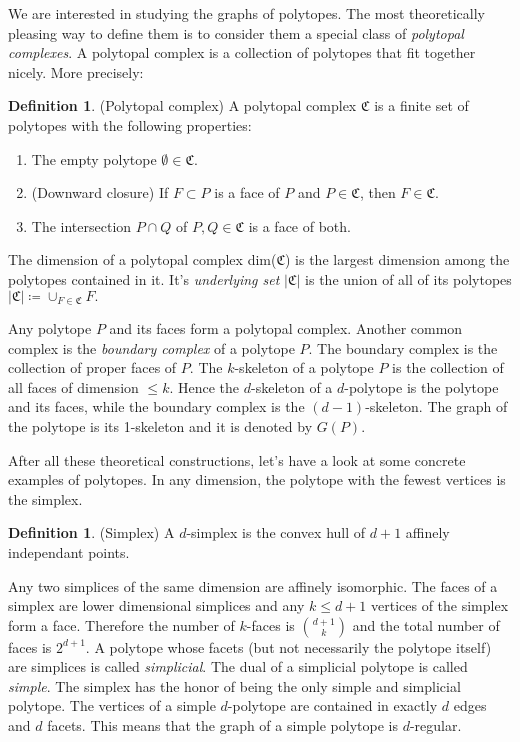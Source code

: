 \documentclass[a4paper,12pt]{book}
\theoremstyle{plain}
\theoremstyle{definition}
\newtheorem{definition}[theorem]{Definition}
\begin{document}
We are interested in studying the graphs of polytopes. The most theoretically 
pleasing way to define them is to consider them a special class of 
\textit{polytopal complexes}.
A polytopal complex is a collection of polytopes that fit together nicely.
More precisely:
\begin{definition}
 (Polytopal complex) A polytopal complex $\mathfrak{C}$ is a finite set of 
polytopes with the following properties:
\begin{enumerate}
 \item The empty polytope $\emptyset \in \mathfrak{C}$.
  \item (Downward closure) If $F \subset P$ is a face of $P$ and $P \in 
\mathfrak{C}$, then 
$F \in \mathfrak{C}$.
\item The intersection $P\cap Q$ of $P,Q \in \mathfrak{C}$ is a face of both.

\end{enumerate}

\end{definition}

The dimension of a polytopal complex dim($\mathfrak{C}$) is the largest dimension
among the polytopes contained in it. It's \textit{underlying set} $|\mathfrak{C}|$ is the union of all of 
its polytopes $  |\mathfrak{C}| \coloneqq \cup_{F\in \mathfrak{C}} F.$

Any polytope $P$ and its faces form a polytopal complex. Another common complex is the 
\textit{boundary complex} of a polytope
$P$. The boundary complex is the collection of proper faces of $P$.
The $k$-skeleton of a polytope $P$ is the collection of all faces of dimension $\leq 
k$. Hence the $d$-skeleton of a $d$-polytope is the polytope and its faces, while the 
boundary complex is the $(d-1)$-skeleton. The graph of the polytope is its 
1-skeleton and it is denoted by $G(P)$.

After all these theoretical constructions, let's have a look at some concrete examples
of polytopes.
In any dimension, the polytope with the fewest vertices is the simplex. 
\begin{definition}
 (Simplex) A $d$-simplex is the convex hull of $d+1$ affinely independant 
points.
\end{definition}
Any two simplices of the same dimension are affinely isomorphic.
The faces of a simplex are lower dimensional simplices and any $k\le d+1$ vertices
of the simplex form a face. Therefore the number of $k$-faces is $\binom{d+1}{k}$
and the total number of faces is $2^{d+1}$.
 A polytope whose facets 
(but not necessarily the polytope itself) are simplices is called 
\textit{simplicial}. The dual of a simplicial polytope is called 
\textit{simple}. The simplex has the honor of being the only simple and simplicial polytope.
The vertices of a simple $d$-polytope are contained in exactly 
$d$ edges and $d$ facets. This means that the graph of a simple polytope is $d$-regular.
\end{document}
